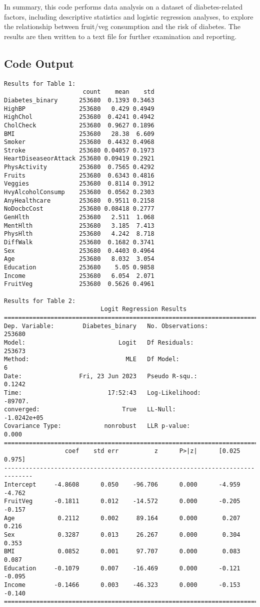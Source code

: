 \documentclass[11pt]{article}
\begin{document}
In summary, this code performs data analysis on a dataset of diabetes-related factors, including descriptive statistics and logistic regression analyses, to explore the relationship between fruit/veg consumption and the risk of diabetes. The results are then written to a text file for further examination and reporting.

\subsection*{Code Output}

\begin{Verbatim}[tabsize=4]
Results for Table 1:
                      count    mean    std
Diabetes_binary      253680  0.1393 0.3463
HighBP               253680   0.429 0.4949
HighChol             253680  0.4241 0.4942
CholCheck            253680  0.9627 0.1896
BMI                  253680   28.38  6.609
Smoker               253680  0.4432 0.4968
Stroke               253680 0.04057 0.1973
HeartDiseaseorAttack 253680 0.09419 0.2921
PhysActivity         253680  0.7565 0.4292
Fruits               253680  0.6343 0.4816
Veggies              253680  0.8114 0.3912
HvyAlcoholConsump    253680  0.0562 0.2303
AnyHealthcare        253680  0.9511 0.2158
NoDocbcCost          253680 0.08418 0.2777
GenHlth              253680   2.511  1.068
MentHlth             253680   3.185  7.413
PhysHlth             253680   4.242  8.718
DiffWalk             253680  0.1682 0.3741
Sex                  253680  0.4403 0.4964
Age                  253680   8.032  3.054
Education            253680    5.05 0.9858
Income               253680   6.054  2.071
FruitVeg             253680  0.5626 0.4961

Results for Table 2:
                           Logit Regression Results
==============================================================================
Dep. Variable:        Diabetes_binary   No. Observations:               253680
Model:                          Logit   Df Residuals:                   253673
Method:                           MLE   Df Model:                            6
Date:                Fri, 23 Jun 2023   Pseudo R-squ.:                  0.1242
Time:                        17:52:43   Log-Likelihood:                -89707.
converged:                       True   LL-Null:                   -1.0242e+05
Covariance Type:            nonrobust   LLR p-value:                     0.000
==============================================================================
                 coef    std err          z      P>|z|      [0.025      0.975]
------------------------------------------------------------------------------
Intercept     -4.8608      0.050    -96.706      0.000      -4.959      -4.762
FruitVeg      -0.1811      0.012    -14.572      0.000      -0.205      -0.157
Age            0.2112      0.002     89.164      0.000       0.207       0.216
Sex            0.3287      0.013     26.267      0.000       0.304       0.353
BMI            0.0852      0.001     97.707      0.000       0.083       0.087
Education     -0.1079      0.007    -16.469      0.000      -0.121      -0.095
Income        -0.1466      0.003    -46.323      0.000      -0.153      -0.140
==============================================================================


\end{Verbatim}
\end{document}
